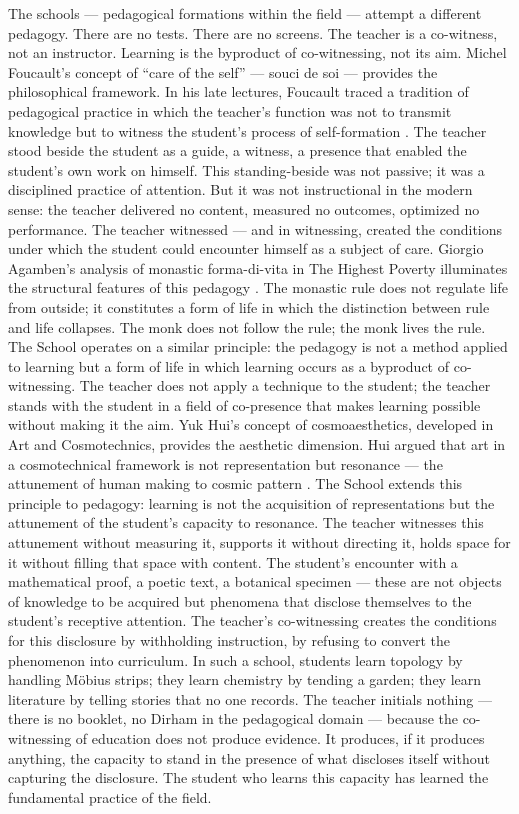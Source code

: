 The  schools — pedagogical formations within the field — attempt a different pedagogy. There are no tests. There are no screens. The teacher is a co-witness, not an instructor. Learning is the byproduct of co-witnessing, not its aim. Michel Foucault’s concept of “care of the self” — souci de soi — provides the philosophical framework. In his late lectures, Foucault traced a tradition of pedagogical practice in which the teacher’s function was not to transmit knowledge but to witness the student’s process of self-formation \cite[pp.~93--113]{foucault_1981}. The teacher stood beside the student as a guide, a witness, a presence that enabled the student’s own work on himself. This standing-beside was not passive; it was a disciplined practice of attention. But it was not instructional in the modern sense: the teacher delivered no content, measured no outcomes, optimized no performance. The teacher witnessed — and in witnessing, created the conditions under which the student could encounter himself as a subject of care. Giorgio Agamben’s analysis of monastic forma-di-vita in The Highest Poverty illuminates the structural features of this pedagogy \cite[pp.~89--134]{agamben_2011}. The monastic rule does not regulate life from outside; it constitutes a form of life in which the distinction between rule and life collapses. The monk does not follow the rule; the monk lives the rule. The  School operates on a similar principle: the pedagogy is not a method applied to learning but a form of life in which learning occurs as a byproduct of co-witnessing. The teacher does not apply a technique to the student; the teacher stands with the student in a field of co-presence that makes learning possible without making it the aim. Yuk Hui’s concept of cosmoaesthetics, developed in Art and Cosmotechnics, provides the aesthetic dimension. Hui argued that art in a cosmotechnical framework is not representation but resonance — the attunement of human making to cosmic pattern \cite[pp.~78--112]{hui_2021}. The  School extends this principle to pedagogy: learning is not the acquisition of representations but the attunement of the student’s capacity to resonance. The teacher witnesses this attunement without measuring it, supports it without directing it, holds space for it without filling that space with content. The student’s encounter with a mathematical proof, a poetic text, a botanical specimen — these are not objects of knowledge to be acquired but phenomena that disclose themselves to the student’s receptive attention. The teacher’s co-witnessing creates the conditions for this disclosure by withholding instruction, by refusing to convert the phenomenon into curriculum. In such a school, students learn topology by handling Möbius strips; they learn chemistry by tending a garden; they learn literature by telling stories that no one records. The teacher initials nothing — there is no booklet, no Dirham in the pedagogical domain — because the co-witnessing of education does not produce evidence. It produces, if it produces anything, the capacity to stand in the presence of what discloses itself without capturing the disclosure. The student who learns this capacity has learned the fundamental practice of the field.

